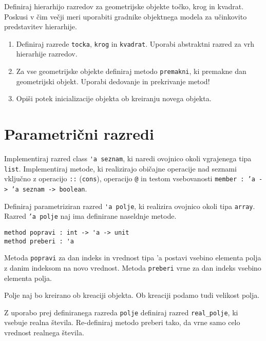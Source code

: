 \begin{ex}
Definiraj hierarhijo razredov za geometrijske objekte to\v cko, krog in kvadrat. Poskusi v \v cim ve\v cji meri uporabiti gradnike objektnega modela za u\v cinkovito predstavitev hierarhije. 

\begin{enumerate}
\item Definiraj razrede \lstinline{tocka}, \lstinline{krog} in \lstinline{kvadrat}. Uporabi abstraktni razred za vrh hierarhije razredov.

\item Za vse geometrijske objekte definiraj metodo \lstinline{premakni}, ki premakne dan geometrijski objekt. Uporabi dedovanje in prekrivanje metod!

\item Opi\v si potek inicializacije objekta ob kreiranju novega objekta.
\end{enumerate}
\end{ex} 







\section{Parametri\v cni razredi}





\begin{ex}
Implementiraj razred class \lstinline{'a seznam}, ki naredi ovojnico okoli vgrajenega tipa \texttt{list}. Implementiraj metode, ki realizirajo obi\v cajne operacije nad seznami vključno z operacijo \texttt{::} (\texttt{cons}), operacijo \texttt{@} in testom vsebovanosti \texttt{member : 'a -> 'a seznam -> boolean}.
\end{ex}





\begin{ex}
Definiraj parametriziran razred \lstinline{'a polje}, ki realizira ovojnico okoli tipa \lstinline{array}. Razred \texttt{'a polje} naj ima definirane naseldnje metode.
\begin{lstlisting}
method popravi : int -> 'a -> unit
method preberi : 'a 
\end{lstlisting}
Metoda \texttt{popravi} za dan indeks in vrednost tipa 'a postavi vsebino elementa polja z danim indeksom na novo vrednost. Metoda \texttt{preberi} vrne za dan indeks vsebino elementa polja. 

Polje naj bo kreirano ob kreaciji objekta. Ob kreaciji podamo tudi velikost polja.

Z uporabo prej definiranega razreda \lstinline{polje} definiraj razred \lstinline{real_polje}, ki vsebuje realna \v stevila. Re-definiraj metodo preberi tako, da vrne samo celo vrednost realnega \v stevila.
\end{ex}





